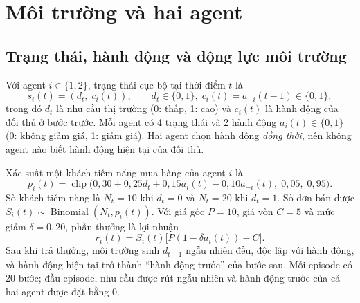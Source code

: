 \documentclass[12pt,a4paper]{report}
\begin{document}
\chapter{Môi trường và hai agent}
\label{chap:model}

\section{Trạng thái, hành động và động lực môi trường}
Với agent $i\in\{1,2\}$, trạng thái cục bộ tại thời điểm $t$ là
\begin{equation}
s_i(t)=(d_t,\;c_i(t)),\qquad d_t\in\{0,1\},\; c_i(t)=a_{-i}(t-1)\in\{0,1\},
\end{equation}
trong đó $d_t$ là nhu cầu thị trường (0: thấp, 1: cao) và $c_i(t)$ là hành động
của đối thủ ở bước trước. Mỗi agent có 4 trạng thái và 2 hành động
$a_i(t)\in\{0,1\}$ (0: không giảm giá, 1: giảm giá). Hai agent chọn hành động
\emph{đồng thời}, nên không agent nào biết hành động hiện tại của đối thủ.

Xác suất một khách tiềm năng mua hàng của agent $i$ là
\begin{equation}
p_i(t)=\operatorname{clip}\bigl(0{,}30+0{,}25d_t+0{,}15a_i(t)-0{,}10a_{-i}(t),\;0{,}05,\;0{,}95\bigr).
\label{eq:conv}
\end{equation}
Số khách tiềm năng là $N_t=10$ khi $d_t=0$ và $N_t=20$ khi $d_t=1$. Số đơn bán được
$S_i(t)\sim\operatorname{Binomial}(N_t,p_i(t))$. Với giá gốc $P=10$, giá vốn $C=5$
và mức giảm $\delta=0{,}20$, phần thưởng là lợi nhuận
\begin{equation}
r_i(t)=S_i(t)\bigl[P(1-\delta a_i(t))-C\bigr].
\label{eq:reward}
\end{equation}
Sau khi trả thưởng, môi trường sinh $d_{t+1}$ ngẫu nhiên đều, độc lập với hành động,
và hành động hiện tại trở thành ``hành động trước'' của bước sau. Mỗi episode có
20 bước; đầu episode, nhu cầu được rút ngẫu nhiên và hành động trước của cả hai
agent được đặt bằng 0.
\end{document}
